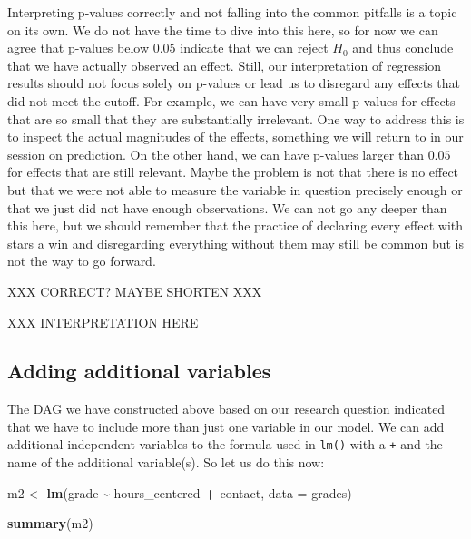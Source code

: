 \documentclass[
]{book}
\newenvironment{Shaded}{\begin{snugshade}}{\end{snugshade}}
\newcommand{\AttributeTok}[1]{\textcolor[rgb]{0.13,0.29,0.53}{#1}}
\newcommand{\FunctionTok}[1]{\textcolor[rgb]{0.13,0.29,0.53}{\textbf{#1}}}
\newcommand{\NormalTok}[1]{#1}
\newcommand{\OtherTok}[1]{\textcolor[rgb]{0.56,0.35,0.01}{#1}}
\newcommand{\SpecialCharTok}[1]{\textcolor[rgb]{0.81,0.36,0.00}{\textbf{#1}}}
\begin{document}
Interpreting p-values correctly and not falling into the common pitfalls is a
topic on its own. We do not have the time to dive into this here, so for now we
can agree that p-values below \(0.05\) indicate that we can reject \(H_0\) and thus
conclude that we have actually observed an effect. Still, our interpretation of
regression results should not focus solely on p-values or lead us to disregard
any effects that did not meet the cutoff. For example, we can have very small
p-values for effects that are so small that they are substantially irrelevant.
One way to address this is to inspect the actual magnitudes of the effects,
something we will return to in our session on prediction. On the other hand, we
can have p-values larger than \(0.05\) for effects that are still relevant. Maybe
the problem is not that there is no effect but that we were not able to measure
the variable in question precisely enough or that we just did not have enough
observations. We can not go any deeper than this here, but we should remember
that the practice of declaring every effect with stars a win and disregarding
everything without them may still be common but is not the way to go forward.

XXX CORRECT? MAYBE SHORTEN XXX

XXX INTERPRETATION HERE

\hypertarget{adding-additional-variables-1}{%
\subsection{Adding additional variables}\label{adding-additional-variables-1}}

The DAG we have constructed above based on our research question indicated that
we have to include more than just one variable in our model.
We can add additional independent variables to the formula used in \texttt{lm()} with a
\texttt{+} and the name of the additional variable(s).
So let us do this now:

\begin{Shaded}
\begin{Highlighting}[]
\NormalTok{m2 }\OtherTok{\textless{}{-}} \FunctionTok{lm}\NormalTok{(grade }\SpecialCharTok{\textasciitilde{}}\NormalTok{ hours\_centered }\SpecialCharTok{+}\NormalTok{ contact, }\AttributeTok{data =}\NormalTok{ grades)}

\FunctionTok{summary}\NormalTok{(m2)}
\end{Highlighting}
\end{Shaded}
\end{document}
